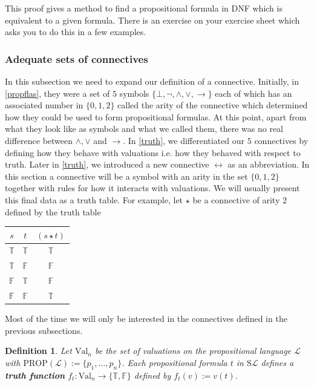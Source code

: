 \documentclass[11pt]{article}
\newcommand{\PROP}{\mathrm{PROP}}
\newcommand{\PF}{\mathrm{S}}
\newtheorem{definition}[theorem]{Definition}
\newcommand{\mcal}[1]{\mathcal{#1}}
\newcommand{\F}{\mathbb{F}}
\newcommand{\T}{\mathbb{T}}
\begin{document}
This proof gives a method to find a propositional formula in DNF which is equivalent to a given formula. There is an exercise on your exercise sheet which asks you to do this in a few examples.


\subsubsection*{Adequate sets of connectives}

In this subsection we need to expand our definition of a connective. Initially, in \ref{propflas}, they were a set of $5$ symbols $\{\bot, \neg, \wedge, \vee, \rightarrow\}$ each of which has an associated number in $\{0,1,2\}$ called the arity of the connective which determined how they could be used to form propositional formulas. At this point, apart from what they look like as symbols and what we called them, there was no real difference between $\wedge, \vee$ and $\rightarrow$. In \ref{truth}, we differentiated our $5$ connectives by defining how they behave with valuations i.e. how they behaved with respect to truth. Later in \ref{truth}, we introduced a new connective $\leftrightarrow$ as an abbreviation. In this section a connective will be a symbol with an arity in the set $\{0,1,2\}$ together with rules for how it interacts with valuations. We will usually present this final data as a truth table. For example, let $\star$ be a connective of arity $2$ defined by the truth table

\smallskip

\begin{tabular}{|c|c||c|}
  \hline
  $s$ & $t$ & $(s\star t)$ \\\hline
  $\T$ & $\T$ & $\T$ \\
  $\T$ & $\F$ & $\F$ \\
  $\F$ & $\T$ & $\F$ \\
  $\F$ & $\F$ & $\T$ \\
  \hline
\end{tabular}

\smallskip

Most of the time we will only be interested in the connectives defined in the previous subsections.

\begin{definition}
Let $\textrm{Val}_n$ be the set of valuations on the propositional language $\mcal{L}$ with $\PROP(\mcal{L}):=\{p_1,\ldots,p_n\}$. Each propositional formula $t$ in $\PF\mcal{L}$ defines a \textbf{truth function} $f_t:\textrm{Val}_n\rightarrow \{\T,\F\}$ defined by $f_t(v):=v(t)$.
\end{definition}
\end{document}
